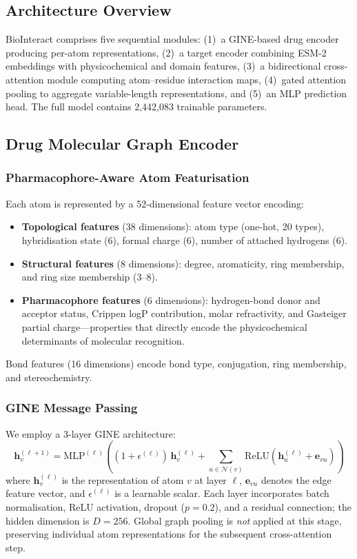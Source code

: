 \documentclass[fleqn,10pt]{wlscirep}
\begin{document}
\subsection{Architecture Overview}

BioInteract comprises five sequential modules:
(1)~a GINE-based drug encoder producing per-atom representations,
(2)~a target encoder combining ESM-2 embeddings with physicochemical and domain
features,
(3)~a bidirectional cross-attention module computing atom--residue interaction
maps,
(4)~gated attention pooling to aggregate variable-length representations, and
(5)~an MLP prediction head.
The full model contains 2{,}442{,}083 trainable parameters.

\subsection{Drug Molecular Graph Encoder}

\subsubsection{Pharmacophore-Aware Atom Featurisation}

Each atom is represented by a 52-dimensional feature vector encoding:
\begin{itemize}[leftmargin=*]
\item \textbf{Topological features} (38 dimensions): atom type (one-hot,
  20 types), hybridisation state (6), formal charge (6), number of
  attached hydrogens (6).
\item \textbf{Structural features} (8 dimensions): degree, aromaticity, ring
  membership, and ring size membership (3--8).
\item \textbf{Pharmacophore features} (6 dimensions): hydrogen-bond donor and
  acceptor status, Crippen logP contribution, molar refractivity, and Gasteiger
  partial charge---properties that directly encode the physicochemical
  determinants of molecular recognition.
\end{itemize}
Bond features (16 dimensions) encode bond type, conjugation, ring membership,
and stereochemistry.

\subsubsection{GINE Message Passing}

We employ a 3-layer GINE
architecture:\cite{hu2020strategies}
\begin{equation}
\mathbf{h}_v^{(\ell+1)} = \mathrm{MLP}^{(\ell)}\!\left(
  (1+\epsilon^{(\ell)})\,\mathbf{h}_v^{(\ell)} +
  \sum_{u\in\mathcal{N}(v)}
  \mathrm{ReLU}\!\left(\mathbf{h}_u^{(\ell)} + \mathbf{e}_{vu}\right)
\right)
\end{equation}
where $\mathbf{h}_v^{(\ell)}$ is the representation of atom $v$ at layer $\ell$,
$\mathbf{e}_{vu}$ denotes the edge feature vector, and $\epsilon^{(\ell)}$ is a
learnable scalar.  Each layer incorporates batch normalisation, ReLU activation,
dropout ($p=0.2$), and a residual connection; the hidden dimension is $D=256$.
Global graph pooling is \emph{not} applied at this stage, preserving individual
atom representations for the subsequent cross-attention step.
\end{document}
